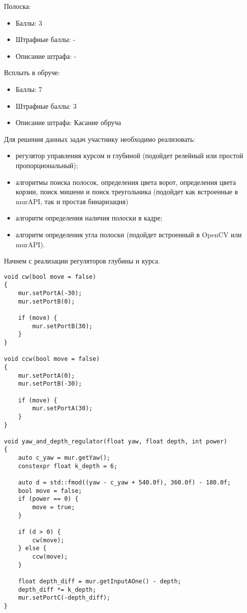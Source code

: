 Полоска:
\begin{itemize}
    \item Баллы: 3
    \item Штрафные баллы: -
    \item Описание штрафа: -
\end{itemize}

Всплыть в обруче:
\begin{itemize}
    \item Баллы: 7
    \item Штрафные баллы: 3
    \item Описание штрафа: Касание обруча
\end{itemize}

\solutionSection

Для решения данных задач участнику необходимо реализовать:

\begin{itemize}
    \item регулятор управления курсом и глубиной (подойдет релейный или простой пропорциональный);
    \item алгоритмы поиска полосок, определения цвета ворот, определения цвета корзин, поиск мишени и поиск треугольника (подойдет как встроенные в murAPI, так и простая бинаризация)  
    \item алгоритм определения наличия полоски в кадре;
    \item алгоритм определения угла полоски (подойдет встроенный в OpenCV или murAPI).
\end{itemize}

Начнем с реализации регуляторов глубины и курса. 

\begin{verbatim}
void cw(bool move = false)
{
    mur.setPortA(-30);
    mur.setPortB(0);

    if (move) {
        mur.setPortB(30);
    }
}

void ccw(bool move = false)
{
    mur.setPortA(0);
    mur.setPortB(-30);

    if (move) {
        mur.setPortA(30);
    }
}

void yaw_and_depth_regulator(float yaw, float depth, int power)
{
    auto c_yaw = mur.getYaw();
    constexpr float k_depth = 6;

    auto d = std::fmod((yaw - c_yaw + 540.0f), 360.0f) - 180.0f;
    bool move = false;
    if (power == 0) {
        move = true;
    }

    if (d > 0) {
        cw(move);
    } else {
        ccw(move);
    }

    float depth_diff = mur.getInputAOne() - depth;
    depth_diff *= k_depth;
    mur.setPortC(-depth_diff);
}
\end{verbatim}

